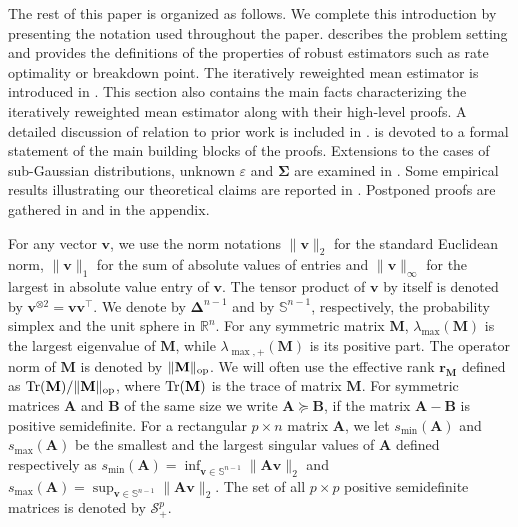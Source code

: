 \documentclass[aos,preprint,reqno]{imsart}
\newcommand\bSigma{\boldsymbol\Sigma}
\newcommand\bDelta{\boldsymbol\Delta}
\newcommand\bfM{\mathbf M}
\newcommand\bfA{\mathbf A}
\newcommand\bfB{\mathbf B}
\newcommand\bv{\boldsymbol v}
\def\tr{\mathop{\textup{Tr}}}
\theoremstyle{plain}
\theoremstyle{remark}
\begin{document}
    
    The rest of this paper is organized as follows. We complete 
    this introduction by presenting the notation used throughout the 
    paper.  describes the problem setting and 
    provides the definitions of the properties of robust estimators 
    such as rate optimality or breakdown point. The iteratively 
    reweighted mean estimator is introduced in . 
    This section also contains the main facts characterizing the 
    iteratively reweighted mean estimator along with their 
    high-level proofs. A detailed discussion of relation to prior 
    work is included in . 
    is devoted to a formal statement of the main building blocks 
    of the proofs. Extensions to the cases of sub-Gaussian 
    distributions, unknown $\varepsilon$ and $\bSigma$ are 
    examined in . Some empirical results 
    illustrating our theoretical claims are reported in
    . Postponed proofs are gathered in  
     and in the appendix.
    
    For any vector $\bv$, we use the norm notations 
    $\|\bv\|_2$ for the standard Euclidean norm, $\|\bv\|_1$ for 
    the sum of absolute values of entries and $\|\bv\|_\infty$ 
    for the largest in absolute value entry of $\bv$. The tensor 
    product of $\bv$ by itself is denoted by $\bv^{\otimes 2} = 
    \bv\bv^\top$. We denote by 
    $\bDelta^{n-1}$ and by $\mathbb S^{n-1}$, respectively, the 
    probability simplex and the unit sphere in $\mathbb R^n$. 
    For any symmetric matrix $\bfM$, $\lambda_{\max}(\bfM)$ is 
    the largest eigenvalue of $\bfM$, while $\lambda_{\max,+}(\bfM)$ 
    is its positive part. The operator norm of $\bfM$ is denoted 
    by $\|\bfM\|_{\textup{op}}$. We will often use the effective 
    rank $\mathbf r_{\bfM}$ defined as $\tr(\bfM)/\|\bfM\|_{
    \textup{op}}$, where $\tr(\bfM)$ is the trace of matrix $\bfM$. 
    {For symmetric matrices $\bfA$ and $\bfB$ of the same size 
    we write $\bfA \succeq \bfB$, if the matrix $\bfA - \bfB$ 
    is positive semidefinite.} 
    For a rectangular $p\times n$ matrix $\bfA$, we let 
    $s_{\min}(\bfA)$ and $s_{\max}(\bfA)$ be the smallest and the 
    largest singular values of $\bfA$ defined respectively as 
    $s_{\min}(\bfA) = \inf_{\bv\in\mathbb S^{n-1}} \|\bfA\bv\|_2$ 
    and $s_{\max}(\bfA) = \sup_{\bv\in\mathbb S^{n-1}} \|\bfA\bv\|_2$. 
    The set of all $p\times p$ positive semidefinite matrices is 
    denoted by $\mathcal S_{+}^p$. 
    
\end{document}
